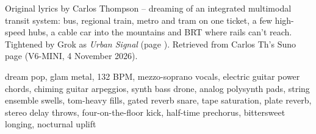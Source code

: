 
\label{sec:dreaming-is-cheap}
\begin{notes}
Original lyrics by Carlos Thompson -- dreaming of an integrated multimodal transit system: bus, regional train, metro and tram on one ticket, a few high-speed hubs, a cable car into the mountains and BRT where rails can't reach. Tightened by Grok as \emph{Urban Signal} (page \pageref{sec:urban-signal}). Retrieved from Carlos Th's Suno page (V6-MINI, 4 November 2026).
\end{notes}
\begin{style}
dream pop, glam metal, 132 BPM, mezzo-soprano vocals, electric guitar power chords, chiming guitar arpeggios, synth bass drone, analog polysynth pads, string ensemble swells, tom-heavy fills, gated reverb snare, tape saturation, plate reverb, stereo delay throws, four-on-the-floor kick, half-time prechorus, bittersweet longing, nocturnal uplift
\end{style}
